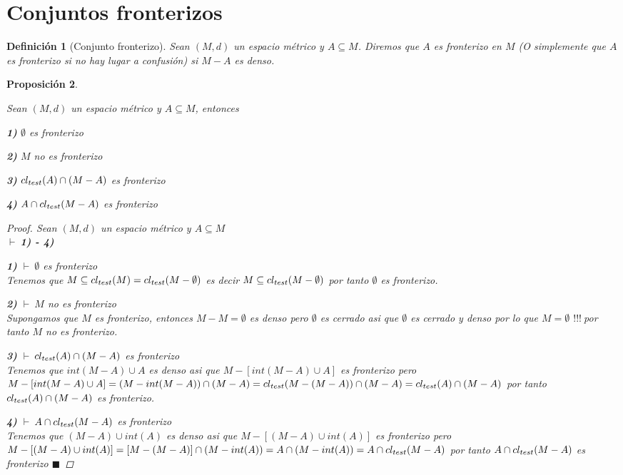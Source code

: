 \documentclass[oneside]{book} %
\theoremstyle{Teorema}
\newtheorem{Definicion}{Definición}[chapter]
\newtheorem{Proposicion}[Definicion]{Proposición}
\theoremstyle{Ejemplos}
\theoremstyle{[Obs]}
\def \test {test}
\newcommand{\cerradura}[2][\test]{\ifx \test #1 {\overline{#2}} \else {cl_{#1}(#2)} \fi} %
\renewcommand{\{}{\left\lbrace} %
\renewcommand{\}}{\right\rbrace} %
\renewcommand{\u}{\cup} %
\newcommand{\n}{\cap} %
\renewcommand{\sc}{\subseteq} %
\renewcommand{\qed}{$\blacksquare$} %
\newcommand{\pd}{$\vdash\ $} %
\renewcommand{\c}{$!!!\ $} %
\begin{document}
		\section{Conjuntos fronterizos}

			\begin{Definicion}[Conjunto fronterizo]\setlength{\parindent}{0em}
				
				Sean $(M, d)$ un espacio métrico y $A \sc M$. Diremos que $A$ es fronterizo en $M$ (O simplemente que $A$ es fronterizo si no hay lugar a confusión) si $M - A$ es denso. 

			\end{Definicion}

			\begin{Proposicion}\label{Proposicion: Ejemplos de fronterizos}\setlength{\parindent}{0em}
			
				Sean $(M, d)$ un espacio métrico y $A \sc M$, entonces 

				\textbf{1)} $\emptyset$ es fronterizo 

				\textbf{2)} $M$ no es fronterizo 

				\textbf{3)} $\cerradura{A} \n (M - A)$ es fronterizo 

				\textbf{4)} $A \n \cerradura{M - A}$ es fronterizo 

				\begin{proof}
					
					Sean $(M, d)$ un espacio métrico y $A \sc M$ \\ 
					\pd \textbf{1) - 4)}

					\textbf{1)} \pd $\emptyset$ es fronterizo \\ 
					Tenemos que $M \sc \cerradura{M} = \cerradura{M - \emptyset}$ es decir $M \sc \cerradura{M - \emptyset}$ por tanto $\emptyset$ es fronterizo.

					\textbf{2)} \pd $M$ no es fronterizo \\ 
					Supongamos que $M$ es fronterizo, entonces $M - M = \emptyset$ es denso pero $\emptyset$ es cerrado asi que $\emptyset$ es cerrado y denso por lo que $M = \emptyset$ \c por tanto $M$ no es fronterizo.

					\textbf{3)} \pd $\cerradura{A} \n (M - A)$ es fronterizo \\ 
					Tenemos que $int(M - A) \u A$ es denso asi que $M - [int(M - A) \u A]$ es fronterizo pero $M - [int(M - A) \u A] = (M - int(M - A)) \n (M - A) = \cerradura{M - (M - A)} \n (M - A) = \cerradura{A} \n (M - A)$ por tanto $\cerradura{A} \n (M - A)$ es fronterizo.

					\textbf{4)} \pd $A \n \cerradura{M - A}$ es fronterizo \\ 
					Tenemos que $(M - A) \u int(A)$ es denso asi que $M - [(M - A) \u int(A)]$ es fronterizo pero $M - [(M - A) \u int(A)] = [M - (M - A)] \n (M - int(A)) = A \n (M - int(A)) = A \n \cerradura{M - A}$ por tanto $A \n \cerradura{M - A}$ es fronterizo \qed

				\end{proof}
			
			\end{Proposicion}
\end{document}
